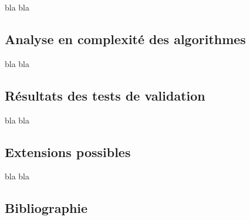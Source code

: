 \begin{titlepage}
\vspace{1cm}
{
bla bla
}


\newpage
\begin{center}
\begin{bf}
\section{Analyse en complexité des algorithmes}
\end{bf}
\end{center}

\vspace{1cm}
{
bla bla
}


\newpage
\begin{center}
\begin{bf}
\section{Résultats des tests de validation}
\end{bf}
\end{center}

\vspace{1cm}
{
bla bla
}


\newpage
\begin{center}
\begin{bf}
\section{Extensions possibles}
\end{bf}
\end{center}

\vspace{1cm}
{
bla bla
}


\newpage
\begin{center}
\begin{bf}
\section{Bibliographie}
\end{bf}
\end{center}
 
	
\end{titlepage}
